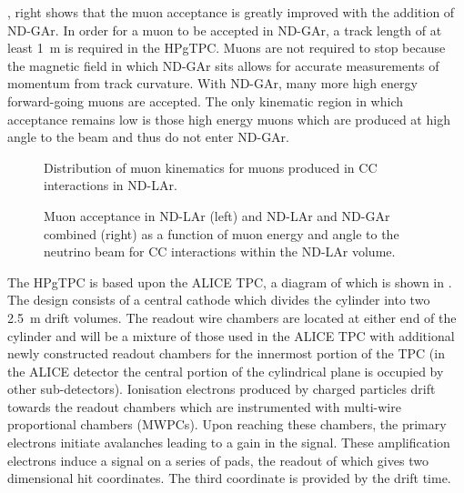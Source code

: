 , right shows that the muon acceptance is greatly improved with the addition of ND-GAr.
In order for a muon to be accepted in ND-GAr, a track length of at least \SI{1}{\metre} is required in the HPgTPC.
Muons are not required to stop because the magnetic field in which ND-GAr sits allows for accurate measurements of momentum from track curvature.
With ND-GAr, many more high energy forward-going muons are accepted.
The only kinematic region in which acceptance remains low is those high energy muons which are produced at high angle to the beam and thus do not enter ND-GAr. 

\begin{figure}[h]
  \begin{adjustbox}{max totalsize={.7\textwidth}, center}
    
  \end{adjustbox}
  \caption[Muon kinematics in the DUNE ND]{Distribution of muon kinematics for muons produced in \numu CC interactions in ND-LAr.}
  \label{fig:muonKinematics}
\end{figure}

\begin{figure}[h]
  \begin{minipage}[t]{0.5\textwidth}
    \begin{adjustbox}{max totalsize={\textwidth}, center}
      
    \end{adjustbox}
  \end{minipage}
  \hfill
  \begin{minipage}[t]{0.5\textwidth}
    \begin{adjustbox}{max totalsize={\textwidth}, center}
      
    \end{adjustbox}
  \end{minipage}
  \caption[Muon acceptance in the DUNE ND]{Muon acceptance in ND-LAr (left) and ND-LAr and ND-GAr combined (right) as a function of muon energy and angle to the neutrino beam for \numu CC interactions within the ND-LAr volume.}
  \label{fig:muonAccND}
\end{figure}

The HPgTPC is based upon the ALICE TPC, a diagram of which is shown in .
The design consists of a central cathode which divides the cylinder into two \SI{2.5}{\metre} drift volumes.
The readout wire chambers are located at either end of the cylinder and will be a mixture of those used in the ALICE TPC with additional newly constructed readout chambers for the innermost portion of the TPC (in the ALICE detector the central portion of the cylindrical plane is occupied by other sub-detectors).
Ionisation electrons produced by charged particles drift towards the readout chambers which are instrumented with multi-wire proportional chambers (MWPCs).
Upon reaching these chambers, the primary electrons initiate avalanches leading to a gain in the signal.
These amplification electrons induce a signal on a series of pads, the readout of which gives two dimensional hit coordinates.
The third coordinate is provided by the drift time.

